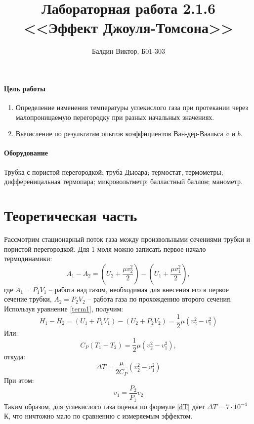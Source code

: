 \documentclass[12pt]{article}
\title{ 
    Лабораторная работа 2.1.6 \\
    <<Эффект Джоуля-Томсона>>
}
\author{Балдин Виктор, Б01-303}
\begin{document}
    \maketitle
    \paragraph{Цель работы}
    \begin{enumerate}
        \item Определение изменения температуры углекислого газа при протекании
        через малопроницаемую перегородку при разных начальных значениях.
        \item Вычисление по результатам опытов коэффициентов Ван-дер-Ваальса 
        $a$ и $b$.
    \end{enumerate}
    \paragraph{Оборудование} Трубка с пористой перегородкой; труба Дьюара;
    термостат, термометры; дифференицальная термопара; микровольтметр; 
    балластный баллон; манометр.

    \section{Теоретическая часть}
    Рассмотрим стационарный поток газа между произвольными сечениями трубки
    и пористой перегородкой. Для 1 моля можно записать первое начало термодинамики:
    \begin{equation}
        A_1 - A_2 = \left(U_2 + \frac{\mu v_2^2}{2}\right) - \left(U_1 + \frac{\mu v_1^2}{2}\right),
        \label{term1}
    \end{equation}
    где $A_1 = P_1V_1$ -- работа над газом, необходимая для внесения его в 
    первое сечение трубки, $A_2 = P_2V_2$ -- работа газа по прохождению второго
    сечения. Используя уравнение \ref{term1}, получим: 
    \begin{equation}
        H_1 - H_2 = (U_1 + P_1V_1) - (U_2 + P_2V_2) = \frac{1}{2}\mu (v_2^2 - v_1^2)
    \end{equation}
    Или:
    \begin{equation}
        C_P(T_1 - T_2) = \frac{1}{2}\mu (v_2^2 - v_1^2),
    \end{equation}
    откуда:
    \begin{equation}
        \Delta T = \frac{\mu}{2C_P}(v_2^2 - v_1^2)
        \label{dT}
    \end{equation}
    При этом:
    \begin{equation}
        v_1 = \frac{P_2}{P_1}v_2
    \end{equation}
    Таким образом, для углекислого газа оценка по формуле \ref{dT} дает 
    $\Delta T = 7 \cdot 10^{-4}$ К, что ничтожно мало по сравнению с измеряемым
    эффектом. 
\end{document}
